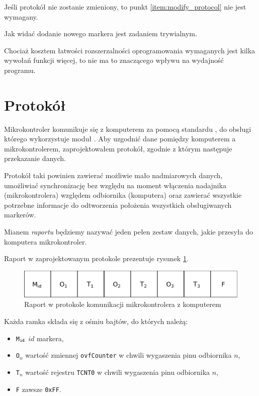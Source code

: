 Jeśli protokół nie zostanie zmieniony, to punkt \ref{item:modify_protocol} nie jest wymagany.

Jak widać dodanie nowego markera jest zadaniem trywialnym.

Chociaż kosztem łatwości rozszerzalności oprogramowania wymaganych jest kilka wywołań funkcji więcej, to nie ma to znaczącego wpływu na wydajność programu.

\section{Protokół}
\label{sec:protocol}
Mikrokontroler komunikuje się z komputerem za pomocą standardu , do obsługi którego wykorzystuje moduł . Aby uzgodnić dane pomiędzy komputerem a mikrokontrolerem, zaprojektowałem protokół, zgodnie z którym następuje przekazanie danych.

Protokół taki powinien zawierać możliwie mało nadmiarowych danych, umożliwiać synchronizację bez względu na moment włączenia nadajnika (mikrokontrolera) względem odbiornika (komputera) oraz zawierać wszystkie potrzebne informacje do odtworzenia położenia wszystkich obsługiwanych markerów.

Mianem \emph{raportu} będziemy nazywać jeden pełen zestaw danych, jakie przesyła do komputera mikrokontroler.

Raport w zaprojektowanym protokole prezentuje rysunek \ref{fig:protocol}.

\begin{figure}
 \includegraphics[width=\textwidth]{gfx/diagramy/protokol.pdf}
 \caption[Schemat raportu]{Raport w protokole komunikacji mikrokontrolera z komputerem}
 \label{fig:protocol}
\end{figure}

Każda ramka składa się z ośmiu bajtów, do których należą:
\begin{itemize}
 \item \texttt{M$_\textrm{\texttt{id}}$} \ppauza $id$ markera,
 \item \texttt{O$_n$} \ppauza wartość zmiennej \texttt{ovfCounter} w chwili wygaszenia pinu odbiornika $n$,
 \item \texttt{T$_n$} \ppauza wartość rejestru \texttt{TCNT0} w chwili wygaszenia pinu odbiornika $n$,
 \item \texttt{F} \ppauza zawsze \texttt{0xFF}.
\end{itemize}

